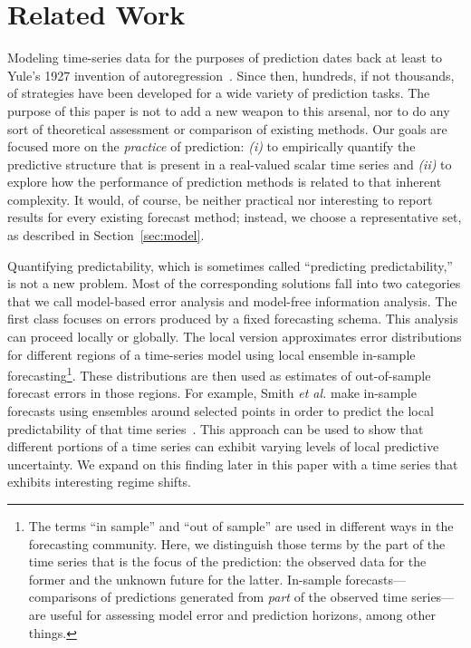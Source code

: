 \section{Related Work }\label{sec:related}

Modeling time-series data for the purposes of prediction dates back at
least to Yule's 1927 invention of autoregression~\cite{Yule27}.  Since
then, hundreds, if not thousands, of strategies have been developed
for a wide variety of prediction tasks.  The purpose of this paper is
not to add a new weapon to this arsenal, nor to do any sort of
theoretical assessment or comparison of existing methods.  Our goals
are focused more on the \emph{practice} of prediction: \emph{(i)} to
empirically quantify the predictive structure that is present in a
real-valued scalar time series and \emph{(ii)} to explore how the
performance of prediction methods is related to that inherent
complexity.  It would, of course, be neither practical nor interesting
to report results for every existing forecast method; instead, we
choose a representative set, as described in Section~\ref{sec:model}.

Quantifying predictability, which is sometimes called ``predicting
predictability,'' is not a new problem.  Most of the corresponding
solutions fall into two categories that we call model-based error
analysis and model-free information analysis.
%
%
%
The first class focuses on errors produced by a fixed forecasting
schema.  This analysis can proceed locally or globally.  The local
version approximates error distributions for different regions of a
time-series model using local ensemble in-sample
forecasting\footnote{The terms ``in sample'' and ``out of sample'' are
  used in different ways in the forecasting community.  Here, we
  distinguish those terms by the part of the time series that is the
  focus of the prediction: the observed data for the former and the
  unknown future for the latter.  In-sample forecasts---comparisons of
  predictions generated from \emph{part} of the observed time
  series---are useful for assessing model error and prediction
  horizons, among other things.}.
%
These distributions are then used as estimates of out-of-sample
forecast errors in those regions.  For example, Smith \emph{et al.}
make in-sample forecasts using ensembles around selected points in
order to predict the local predictability of that time
series~\cite{Smith199250}.  This approach can be used to show that
different portions of a time series can exhibit varying levels of
local predictive uncertainty.  We expand on this finding later in this
paper with a time series that exhibits interesting regime shifts.

